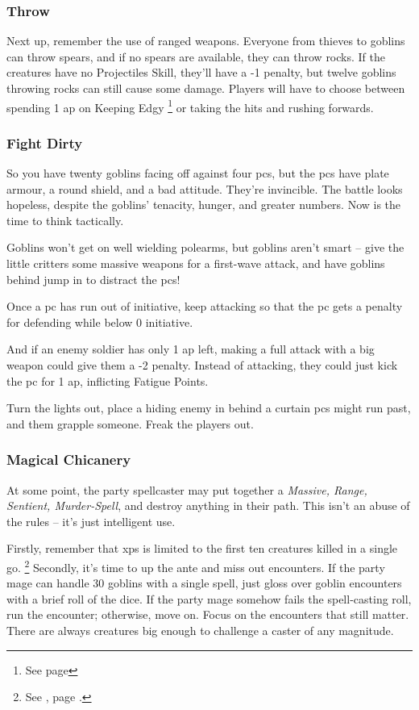 \begin{multicols}{2}
\subsubsection{Throw}

Next up, remember the use of ranged weapons.
Everyone from thieves to goblins can throw spears, and if no spears are available, they can throw rocks.
If the creatures have no Projectiles Skill, they'll have a -1 penalty, but twelve goblins throwing rocks can still cause some damage.
Players will have to choose between spending 1 \gls{ap} on Keeping Edgy%
\footnote{See page \pageref{edgy}}
 or taking the hits and rushing forwards.

\subsubsection{Fight Dirty}

So you have twenty goblins facing off against four \glspl{pc}, but the \glspl{pc} have plate armour, a round shield, and a bad attitude.
They're invincible.
The battle looks hopeless, despite the goblins' tenacity, hunger, and greater numbers.
Now is the time to think tactically.

Goblins won't get on well wielding polearms, but goblins aren't smart -- give the little critters some massive weapons for a first-wave attack, and have goblins behind jump in to distract the \glspl{pc}!

Once a \gls{pc} has run out of initiative, keep attacking so that the \gls{pc} gets a penalty for defending while below 0 initiative.

And if an enemy soldier has only 1 \gls{ap} left, making a full attack with a big weapon could give them a -2 penalty.
Instead of attacking, they could just kick the \gls{pc} for 1 \gls{ap}, inflicting Fatigue Points.

Turn the lights out, place a hiding enemy in behind a curtain \glspl{pc} might run past, and them grapple someone.
Freak the players out.

\subsubsection{Magical Chicanery}

At some point, the party spellcaster may put together a \textit{Massive, Range, Sentient, Murder-Spell}, and destroy anything in their path.
This isn't an abuse of the rules -- it's just intelligent use.

Firstly, remember that \glspl{xp} is limited to the first ten creatures killed in a single go.%
\footnote{See , page \pageref{xpCreatureMax}.}
Secondly, it's time to up the ante and miss out encounters.
If the party mage can handle 30 goblins with a single spell, just gloss over goblin encounters with a brief roll of the dice.
If the party mage somehow fails the spell-casting roll, run the encounter; otherwise, move on.
Focus on the encounters that still matter.
There are always creatures big enough to challenge a caster of any magnitude.


\end{multicols}
